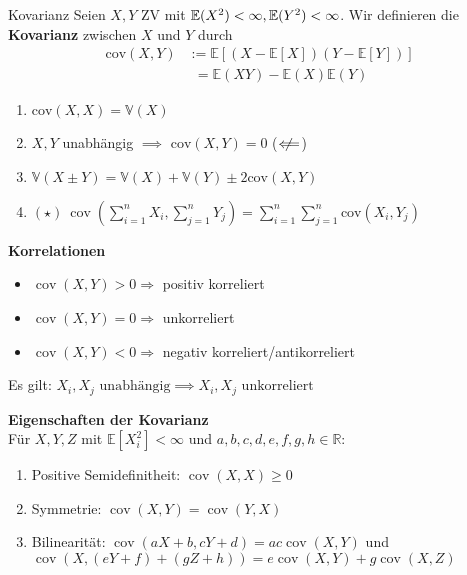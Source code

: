 \begin{mainbox}{Kovarianz}
    Seien $X, Y$ ZV mit $\mathbb{E}(X^2)<\infty, \mathbb{E}(Y^2) < \infty$. Wir definieren die \textbf{Kovarianz} zwischen $X$ und $Y$ durch
    $$
    \begin{aligned}
	    \text{cov}(X,Y) &:= \mathbb{E}[(X-\mathbb{E}[X])(Y-\mathbb{E}[Y])]\\
    	&\phantom{:}= \mathbb{E}(XY) - \mathbb{E}(X)\mathbb{E}(Y)
	\end{aligned}
    $$
\end{mainbox}
\begin{enumerate}
    \item $\text{cov}(X,X) = \mathbb{V}(X)$
    \item $X, Y$ unabhängig $\implies$ $\text{cov}(X, Y) = 0$ ($\centernot \Longleftarrow$)
    \item $\mathbb{V}(X\pm Y) = \mathbb{V}(X) + \mathbb{V}(Y) \pm 2\text{cov}(X, Y)$
    \item $(\star)\ \operatorname{cov}( \sum_{i=1}^{n}X_{i},\sum_{j=1}^n Y_{j})= \sum_{i=1}^{n}\sum_{j=1}^n \text{cov}\left(X_{i},Y_{j}\right)$
\end{enumerate}
\textbf{Korrelationen}
\begin{itemize}
    \item $\operatorname{cov}(X, Y) > 0 \Rightarrow$ positiv korreliert
    \item $\operatorname{cov}(X, Y) = 0 \Rightarrow$ unkorreliert
    \item $\operatorname{cov}(X, Y) < 0 \Rightarrow$ negativ korreliert/antikorreliert
\end{itemize}

Es gilt: $X_i, X_j \text{ unabhängig} \implies X_i, X_j \text{ unkorreliert}$

\textbf{Eigenschaften der Kovarianz}\\
Für $X, Y, Z$ mit $\mathbb{E}[X_{i}^{2}]<\infty$ und $a, b, c, d, e, f, g, h \in \mathbb{R}$: 
\begin{enumerate}
	\item Positive Semidefinitheit: $\operatorname{cov}(X, X) \geq 0$
	\item Symmetrie: $\operatorname{cov}(X, Y)=\operatorname{cov}(Y, X)$
	\item Bilinearität: $\operatorname{cov}(a X+b, c Y+d)=a c \operatorname{cov}(X, Y)$ und $\operatorname{cov}(X,(e Y+f)+(g Z+h))=e \operatorname{cov}(X, Y)+g \operatorname{cov}(X, Z)$
\end{enumerate}

